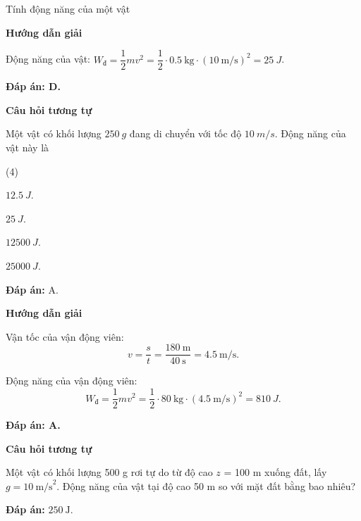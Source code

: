 \begin{dang}{Tính động năng của một vật}
	{	\begin{center}
			\textbf{Hướng dẫn giải}
		\end{center}
		Động năng của vật: $W_\text{đ} = \dfrac{1}{2}mv^2 =\dfrac{1}{2}\cdot\SI{0.5}{\kilogram}\cdot(\SI{10}{\meter/\second})^2= \SI{25}{J}$.
		
		\textbf{Đáp án: D.}
		
		\begin{center}
			\textbf{Câu hỏi tương tự}
		\end{center}
		
		Một vật có khối lượng $\SI{250}{g}$ đang di chuyển với tốc độ $\SI{10}{m/s}$. Động năng của vật này là
		\begin{mcq}(4)
			\item $\SI{12.5}{J}$.
			\item $\SI{25}{J}$.
			\item $\SI{12500}{J}$.
			\item $\SI{25000}{J}$.
		\end{mcq}
		
		\textbf{Đáp án:} A.
	}
	{	\begin{center}
			\textbf{Hướng dẫn giải}
		\end{center}
		
		Vận tốc của vận động viên:
		$$v=\dfrac{s}{t} =\dfrac{\SI{180}{\meter}}{\SI{40}{\second}}= \SI{4.5}{\meter/\second}.$$
		
		Động năng của vận động viên:
		$$W_\text{đ} = \dfrac{1}{2} mv^2 =\dfrac{1}{2}\cdot\SI{80}{\kilogram}\cdot(\SI{4.5}{\meter/\second})^2= \SI{810}{J}.$$
		
		\textbf{Đáp án: A.}
		
		
		\begin{center}
			\textbf{Câu hỏi tương tự}
		\end{center}
		
		Một vật có khối lượng 500 g rơi tự do từ độ cao $z$ = 100 m xuống đất, lấy $g = 10\ \text{m/s}^2$. Động năng của vật tại độ cao 50 m so với mặt đất bằng bao nhiêu?
		
		\textbf{Đáp án:} $250\ \text{J}$.
		
		
	}
\end{dang}

